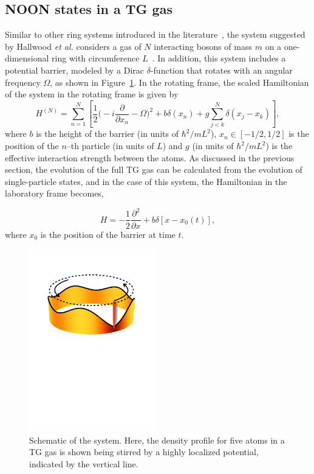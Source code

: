 \subsection{NOON states in a TG gas}
\label{sec:controltro}

Similar to other ring systems introduced in the literature~\cite{das2002,girardeau2009}, the system suggested by Hallwood \textit{et al.} considers a gas of $N$ interacting bosons of mass $m$ on a one-dimensional ring with circumference $L$~\cite{hallwood2010}.
In addition, this system includes a potential barrier, modeled by a Dirac $\delta$-function that rotates with an angular frequency $\Omega$, as shown in Figure~\ref{fig:ring_scheme}.
In the rotating frame, the scaled Hamiltonian of the system in the rotating frame is given by \cite{hallwood2010}
\begin{equation}H^{(N)} = \sum_{n=1} ^{N} \left[{\frac{1}{2}\bigg(-i\frac{\partial}{\partial x_n}-\Omega}\bigg)^2 + b\delta(x_n) +g \sum_{j<k} ^{N} \delta (x_j - x_k )\right],
\end{equation}
\noindent where $b$ is the height of the barrier (in units of $\hbar^2/mL^2$), $x_n \in \left[-1/2,1/2\right]$ is the position of the $n$--th particle (in units of $L$) and $g$ (in units of $\hbar^2/mL^2$) is the effective interaction strength between the atoms.
As discussed in the previous section, the evolution of the full TG gas can be calculated from the evolution of single-particle states, and in the case of this system, the Hamiltonian in the laboratory frame becomes,

\begin{equation}
H = -\frac{1}{2} \frac{\partial^2}{\partial x} + b\delta \left[ x-x_0(t) \right], 
\end{equation}
where $x_0$ is the position of the barrier at time $t$. 

\begin{figure}
\center \includegraphics[width = 0.5\textwidth]{data/1d/scheme.pdf}
\caption{Schematic of the system.
Here, the density profile for five atoms in a TG gas is shown being stirred by a highly localized potential, indicated by the vertical line.}
\label{fig:ring_scheme}
\end{figure}

